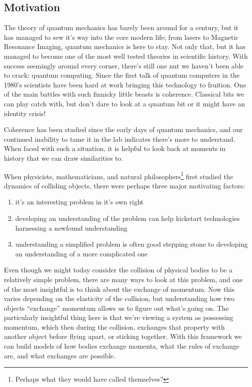 \documentclass[11pt,english]{article}
\theoremstyle{definition}
\begin{document}
\subsection{Motivation}

The theory of quantum mechanics has barely been around for a century, but it has managed to sew it's way into the core modern life; from lasers to Magnetic Resonance Imaging, quantum mechanics is here to stay. Not only that, but it has managed to become one of the most well tested theories in scientific history. With success seemingly around every corner, there's still one nut we haven't been able to crack: quantum computing. Since the first talk of quantum computers in the 1980's scientists have been hard at work bringing this technology to fruition. One of the main battles with such finnicky little beasts is coherence. Classical bits we can play catch with, but don't dare to look at a quantum bit or it might have an identity crisis!

Coherence has been studied since the early days of quantum mechanics, and our continued inability to tame it in the lab indicates there's more to understand. When faced with such a situation, it is helpful to look back at moments in history that we can draw similarities to.

When physicists, mathematicians, and natural philosophers\footnote{Perhaps what they would have called themselves?} first studied the dynamics of colliding objects, there were perhaps three major motivating factors:
\begin{enumerate}
	\item it's an interesting problem in it's own right
	\item developing an understanding of the problem can help kickstart technologies harnessing a newfound understanding
	\item understanding a simplified problem is often good stepping stone to developing an understanding of a more complicated one
\end{enumerate}
Even though we might today consider the collision of physical bodies to be a relatively simple problem, there are many ways to look at this problem, and one of the most insightful is to think about the exchange of momentum. Now this varies depending on the elasticity of the collision, but understanding how two objects ``exchange'' momentum allows us to figure out what's going on. The particularly insightful thing here is that we're viewing a system as possessing momentum, which then during the collision, exchanges that property with another object before flying apart, or sticking together. With this framework we can build models of how bodies exchange momenta, what the rules of exchange are, and what exchanges are possible.
\end{document}

